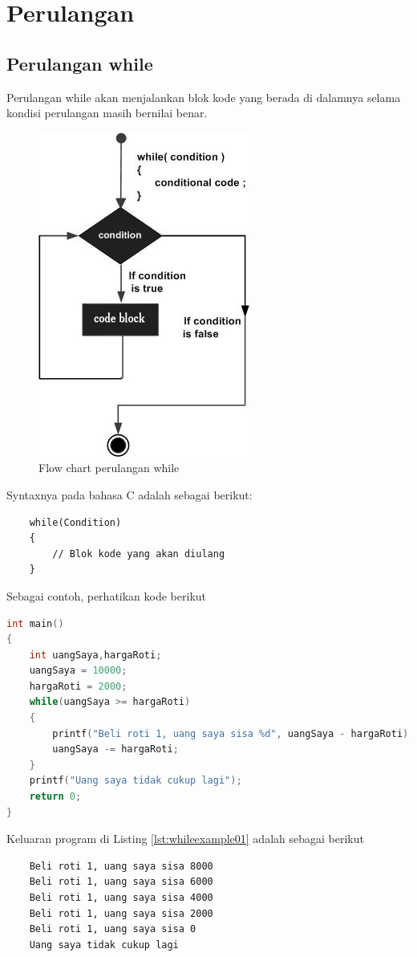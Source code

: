 \section{Perulangan}
\subsection{Perulangan while}
Perulangan while akan menjalankan blok kode yang berada di dalamnya selama kondisi perulangan masih bernilai benar.


\begin{figure}[H]
		\centering
		\includegraphics[width=0.4\linewidth]{../P2/img/whileloop.png}
		\caption{Flow chart perulangan while}
		\label{fig:whileloop}
\end{figure}

Syntaxnya pada bahasa C adalah sebagai berikut:
\begin{verbatim}
    while(Condition)
    {
        // Blok kode yang akan diulang
    }
\end{verbatim}

Sebagai contoh, perhatikan kode berikut
\begin{lstlisting}[language=c,caption = Contoh Penggunaan while,label=lst:whileexample01]
int main()
{
	int uangSaya,hargaRoti;
	uangSaya = 10000;
	hargaRoti = 2000;
	while(uangSaya >= hargaRoti)
	{
	    printf("Beli roti 1, uang saya sisa %d", uangSaya - hargaRoti);
	    uangSaya -= hargaRoti;
	}
	printf("Uang saya tidak cukup lagi");
	return 0;
}
\end{lstlisting}  
Keluaran program di Listing \ref{lst:whileexample01} adalah sebagai berikut
\begin{verbatim}
    Beli roti 1, uang saya sisa 8000
    Beli roti 1, uang saya sisa 6000
    Beli roti 1, uang saya sisa 4000
    Beli roti 1, uang saya sisa 2000
    Beli roti 1, uang saya sisa 0
    Uang saya tidak cukup lagi
\end{verbatim}

